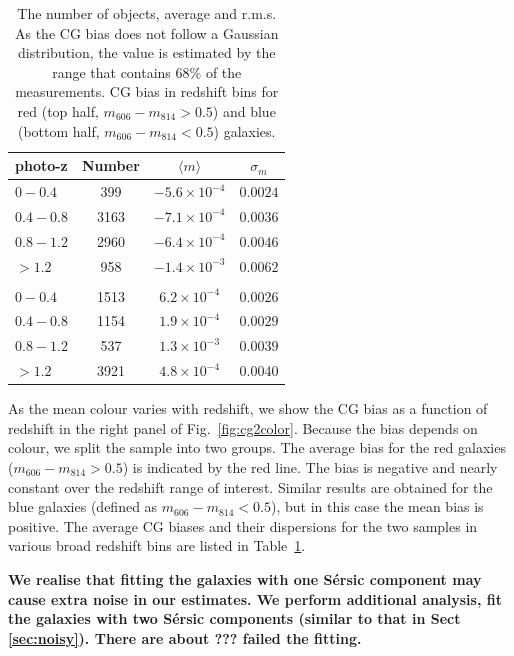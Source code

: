 \documentclass[useAMS,usenatbib]{mnras}
\begin{document}
\begin{table}
\begin{center}
  \begin{tabular}{lccc}
    \hline
    photo-z    &Number &$\langle m\rangle$  &$\sigma_m$ \\
    \hline
    $0-0.4$    &399  &$-5.6\times10^{-4}$  &$0.0024$\\
    $0.4-0.8$  &3163 &$-7.1\times10^{-4}$  &$0.0036$\\
    $0.8-1.2$  &2960 &$-6.4\times10^{-4}$  &$0.0046$\\
    $>1.2$     &958  &$-1.4\times10^{-3}$  &$0.0062$\\
    \\
    $0-0.4$  &1513  &$6.2\times10^{-4}$  &$0.0026$\\
    $0.4-0.8$ &1154  &$1.9\times10^{-4}$  &$0.0029$\\
    $0.8-1.2$ &537  &$1.3\times10^{-3}$  &$0.0039$\\
    $>1.2$  & 3921  &$4.8\times10^{-4}$  &$0.0040$\\
    \hline
  \end{tabular}
  \caption{The number of objects, average and r.m.s. As the CG bias does not follow a Gaussian distribution, the value is estimated by the range that contains $68 \% $ of the measurements. CG bias in redshift bins for red (top half, $m_{606}-m_{814}>0.5$) and blue (bottom half, $m_{606}-m_{814}<0.5$) galaxies. }
  \label{table:calibration}
\end{center}
\end{table}

As the mean colour varies with redshift, we show the CG bias as a function of redshift in the right panel of
Fig.~\ref{fig:cg2color}.  Because the bias depends on colour, we split the sample into two groups. The average bias for the red galaxies ($m_{606}-m_{814}>0.5$) is indicated by the red line. The bias is negative and nearly constant over the redshift range of interest. Similar results are obtained for the blue galaxies
(defined as $m_{606}-m_{814}<0.5$), but in this case the mean bias is positive. The average CG biases and their dispersions for the two samples in various broad redshift bins are listed in Table~\ref{table:calibration}.

{\bf We realise that fitting the galaxies with one S{\'e}rsic component may cause extra noise in our estimates. We perform additional analysis, fit the galaxies with two S{\'e}rsic components (similar to that in Sect\,\ref{sec:noisy}). There are about ??? failed the fitting. 
}
\end{document}

